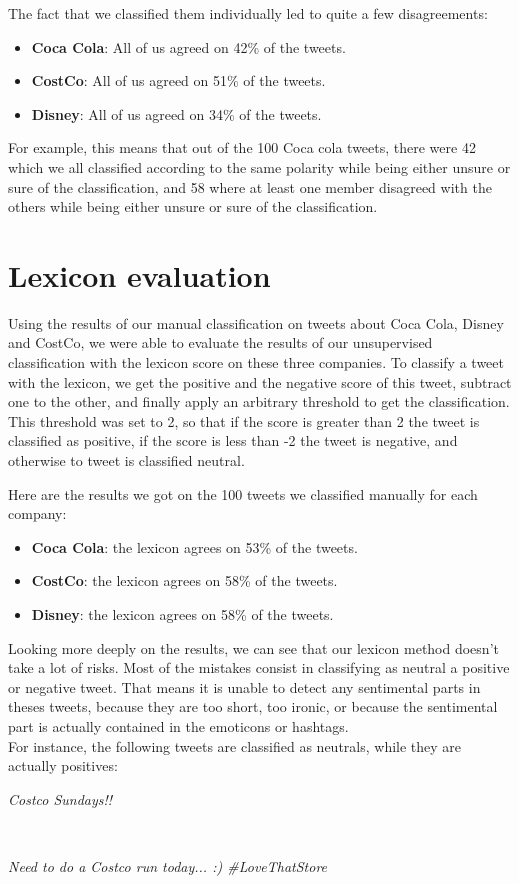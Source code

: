 \documentclass[a4paper,12pt]{report}
\begin{document}
The fact that we classified them individually led to quite a few disagreements:

\begin{itemize}
        \item \textbf{Coca Cola}: All of us agreed on 42\% of the tweets.
        \item \textbf{CostCo}: All of us agreed on 51\% of the tweets.
        \item \textbf{Disney}: All of us agreed on 34\% of the tweets.
\end{itemize}

For example, this means that out of the 100 Coca cola tweets, there were 42 which we all classified according to the same polarity while being either unsure or sure of the classification, and 58 where at least one member disagreed with the others while being either unsure or sure of the classification.

\section{Lexicon evaluation}

Using the results of our manual classification on tweets about Coca Cola, Disney and CostCo, we were able to evaluate the results of our unsupervised classification with the lexicon score on these three companies.
To classify a tweet with the lexicon, we get the positive and the negative score of this tweet, subtract one to the other, and finally apply an arbitrary threshold to get the classification.
This threshold was set to 2, so that if the score is greater than 2 the tweet is classified as positive, if the score is less than -2 the tweet is negative, and otherwise to tweet is classified neutral.

Here are the results we got on the 100 tweets we classified manually for each company:
\begin{itemize}
        \item \textbf{Coca Cola}: the lexicon agrees on 53\% of the tweets.
        \item \textbf{CostCo}: the lexicon agrees on 58\% of the tweets.
        \item \textbf{Disney}: the lexicon agrees on 58\% of the tweets.
\end{itemize}
Looking more deeply on the results, we can see that our lexicon method doesn't take a lot of risks.
Most of the mistakes consist in classifying as neutral a positive or negative tweet. That means it is unable to detect any sentimental parts in theses tweets, because they are too short, too ironic, or because the sentimental part is actually contained in the emoticons or hashtags.\\
For instance, the following tweets are classified as neutrals, while they are actually positives:\\
\centerline{\textit{Costco Sundays!!}}\\
\centerline{\textit{Need to do a Costco run today... :) \#LoveThatStore}}
\end{document}

